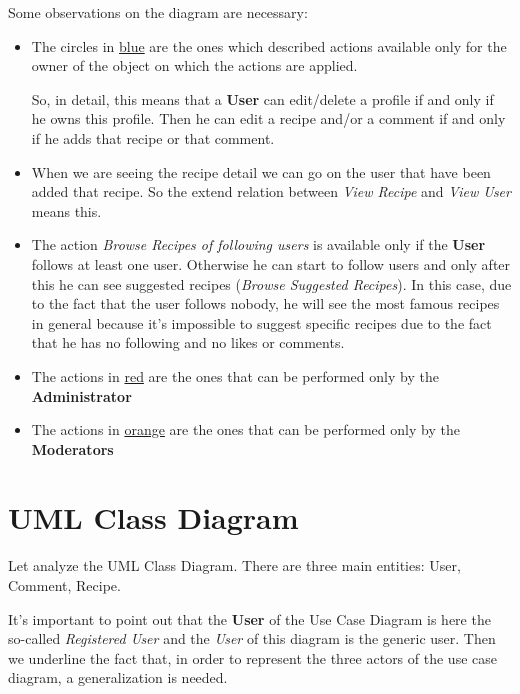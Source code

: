 \documentclass[a4paper]{report}
\begin{document}
\noindent Some observations on the diagram are necessary:
\begin{itemize}
	\item The circles in \underline{blue} are the ones which described actions available only for the owner of the object on which the actions are applied.
	
	\noindent So, in detail, this means that a \textbf{User} can edit/delete a profile if and only if he owns this profile. Then he can edit a recipe and/or a comment if and only if he adds that recipe or that comment.
	
	\item When we are seeing the recipe detail we can go on the user that have been added that recipe. So the extend relation between \emph{View Recipe} and \emph{View User} means this.
	
	\item The action \emph{Browse Recipes of following users} is available only if the \textbf{User} follows at least one user. Otherwise he can start to follow users and only after this he can see suggested recipes (\emph{Browse Suggested Recipes}). In this case, due to the fact that the user follows nobody, he will see the most famous recipes in general because it's impossible to suggest specific recipes due to the fact that he has no following and no likes or comments. 
	
	\item The actions in \underline{red} are the ones that can be performed only by the \textbf{Administrator}
	
	\item The actions in \underline{orange} are the ones that can be performed only by the \textbf{Moderators}
\end{itemize}


\section{UML Class Diagram}
Let analyze the UML Class Diagram. There are three main entities: User, Comment, Recipe.

\noindent It's important to point out that the \textbf{User} of the Use Case Diagram is here the so-called \emph{Registered User} and the \emph{User} of this diagram is the generic user. Then we underline the fact that, in order to represent the three actors of the use case diagram, a generalization is needed.
 
\end{document}

